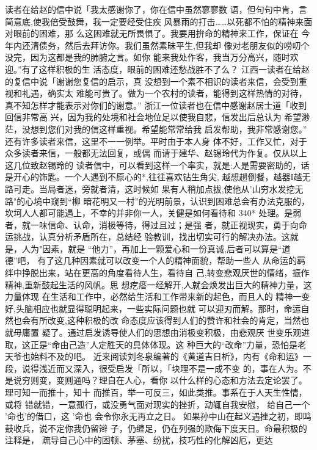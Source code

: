 读者在给赵的信中说「我太感谢你了，你在信中虽然寥寥数
语，但句句中肯，言简意底,使我倍受鼓舞，我一定要经受住疾
风暴雨的打击……以死都不怕的精神来面对眼前的困难，那
么这困难就无所畏惧了。我要用拚命的精神来工作，保证在
今年内还清债务，然后去拜访你。我们虽然素昧平生,但我却
像对老朋友似的唠叨个没完，因为这都是我的肺腑之言。如你
能来我处作客，我当万分高兴，随时欢迎。”有了这样积极的生
活态度，眼前的困难还愁战胜不了么？
江西一读者在给赵的复信中说「谢谢您复信的启示，真
没想到一个素不相识的读者来信，会受到重视和礼遇，确实太
难能可贵了。做为一个农村的读者，能得到这样热情的对待，
真不知怎样才能表示对你们的谢意。”
浙江一位读者也在信中感谢赵居士道「收到回信非常高
兴，因为我的处境和社会地位足以使我自悲，信发出后总认为
希望渺茫，没想到您们对我的信这样重视。希望能常常给我
启发帮助，我非常感谢您。”
还有许多读者来信，这里不一一例举。平时由于本人身
体不好，工作又忙，对于众多读者来信，一般都无法回复，或偶
而请于建华、赵锡玲代为作复。仅从以上这几位致赵锡玲的
读者信中，可以看到这样一个率实，就是:人是需要密助的，话
是开心的饰匙。一个人遇到不原心的*,往往喜欢钻生角尖,
越想趟倒餐，越器I越无路可走。当局者迷，旁就者清，这时候如
果有人稍加点拔,使他从'山穷水发挖无路"的心境中窥到“柳
暗花明又一村”的光明前景，认识到困难总会有办法克服的，
坎坷人人都可能遇上，不幸的并非你一人，关健是如何看待和
 340*
处理。是弱者，就一味信命、认命，消极等待，得过且过；是强
者，就正视现实，勇于向命运挑战，认真分析矛盾所在，总结经
验教训，找出切实可行的解决办法。这就是，人为"因素，就是
“他力”，再加上一颗爱心和一份真诚,后者可以算是“道德”吧，
有了这几种因素就可以改变一个人的精神面貌，帮助一些人
从命运的羁绊中挣脱出来，站在更高的角度看待人生，看待自
己,转变悲观厌世的情绪，振作精神,重新鼓起生活的风帆。思
想疙瘩一经解开,人就会焕发出巨大的精神力量，这力量体现
在生活和工作中，必然给生活和工作带来新的起色，而且人的
精神一变好,头脑相应也就显得聪明起来，一些实际问题也就
可以迎刃而解。那时，命运自然也会有所改变,这种积极的改
命态度应该得到人们的赞许和社会的肯定，当然也就毋庸置
疑了。通过启发诱导使人们的思想由消极变积极，由悲观厌
世变乐观进取，这正是“命由己造”人定胜天的具体体现。这
种巨大的“改命”力量，恐怕是老天爷也始料不及的吧。
近来阅读刘冬泉编著的《黄道吉日析》，内有《命和运》一
段，说得浅近而又深入，很受启发「所以，「块理不是一成不变
的，事在人为。不是说穷则变，变则通吗？理自在人心，看你
以什么样的心态和方法去定论罢了。理可知一而推十，知十
而推百，举一可反三，如此类推。事系在于人天生性情，或将
错就错，一意孤行，或没勇气面对现实的挫折，动辄自我安慰，
给自己一个 '命也'的借口，这 '命也 会令你永无再立之日。
如果孙中山在起义遇挫之初，即鸣鼓收兵，说不定你我仍留辫
子，仍缠足，仍在列强的欺侮下度天日。命最积极的注释是，
疏导自己心中的困顿、茅塞、纷扰，技巧性的化解凶厄，更达
